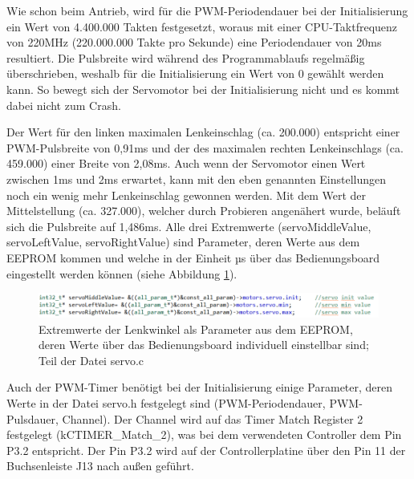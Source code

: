 Wie schon beim Antrieb, wird für die \ac{PWM}-Periodendauer bei der Initialisierung ein Wert von 4.400.000 Takten festgesetzt, woraus mit einer \ac{CPU}-Taktfrequenz von 220MHz (220.000.000 Takte pro Sekunde) eine Periodendauer von 20ms resultiert. Die Pulsbreite wird während des Programmablaufs regelmäßig überschrieben, weshalb für die Initialisierung ein Wert von 0 gewählt werden kann. So bewegt sich der Servomotor bei der Initialisierung nicht und es kommt dabei nicht zum Crash.\vspace{11pt}

Der Wert für den linken maximalen Lenkeinschlag (ca. 200.000) entspricht einer \ac{PWM}-Pulsbreite von 0,91ms und der des maximalen rechten Lenkeinschlags (ca. 459.000) einer Breite von 2,08ms. Auch wenn der Servomotor einen Wert zwischen 1ms und 2ms erwartet, kann mit den eben genannten Einstellungen noch ein wenig mehr Lenkeinschlag gewonnen werden. Mit dem Wert der Mittelstellung (ca. 327.000), welcher durch Probieren angenähert wurde, beläuft sich die Pulsbreite auf 1,486ms. Alle drei Extremwerte (\glqq{}servoMiddleValue\grqq{}, \glqq{}servoLeftValue\grqq{}, \glqq{}servoRightValue\grqq{}) sind Parameter, deren Werte aus dem \ac{EEPROM} kommen und welche in der Einheit µs über das Bedienungsboard eingestellt werden können (siehe Abbildung \ref{fig:ServoC0}).

\begin{figure}[H] %
\includegraphics[width=.95\textwidth]{sec5/images/ServoC0} 
\centering
\captionsetup{width=.95\textwidth}
\caption[Extremwerte der Lenkwinkel als Parameter aus dem \ac{EEPROM}]{Extremwerte der Lenkwinkel als Parameter aus dem \ac{EEPROM}, deren Werte über das Bedienungsboard individuell einstellbar sind; Teil der Datei \glqq{}servo.c\grqq{}}\centering
\label{fig:ServoC0}
\end{figure}

\newpage
Auch der \ac{PWM}-Timer benötigt bei der Initialisierung einige Parameter, deren Werte in der Datei \glqq{}servo.h\grqq{} festgelegt sind (\ac{PWM}-Periodendauer, \ac{PWM}-Pulsdauer, Channel). Der Channel wird auf das Timer Match Register 2 festgelegt (\glqq{}kCTIMER\_Match\_2\grqq{}), was bei dem verwendeten Controller dem Pin P3.2 entspricht. Der Pin P3.2 wird auf der Controllerplatine über den Pin 11 der Buchsenleiste J13 nach außen geführt.

